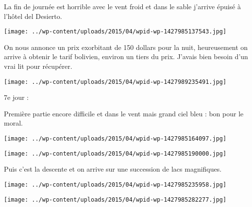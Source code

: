  La fin de journée est horrible avec le vent froid et dans le sable j'arrive épuisé à l'hôtel del Desierto.

 

\begin{center} \texttt{[image: ../wp-content/uploads/2015/04/wpid-wp-1427985137543.jpg]} \end{center}



 On nous annonce un prix exorbitant de 150 dollars pour la nuit, heureusement on arrive à obtenir le tarif bolivien, environ un tiers du prix. J'avais bien besoin d'un vrai lit pour récupérer.

 

\begin{center} \texttt{[image: ../wp-content/uploads/2015/04/wpid-wp-1427989235491.jpg]} \end{center}



 7e jour : 

 Première partie encore difficile et dans le vent mais grand ciel bleu : bon pour le moral.

 

\begin{center} \texttt{[image: ../wp-content/uploads/2015/04/wpid-wp-1427985164097.jpg]} \end{center}



 

\begin{center} \texttt{[image: ../wp-content/uploads/2015/04/wpid-wp-1427985190000.jpg]} \end{center}



 Puis c'est la descente et on arrive sur une succession de lacs magnifiques.

 

\begin{center} \texttt{[image: ../wp-content/uploads/2015/04/wpid-wp-1427985235958.jpg]} \end{center}



 

\begin{center} \texttt{[image: ../wp-content/uploads/2015/04/wpid-wp-1427985282277.jpg]} \end{center}



